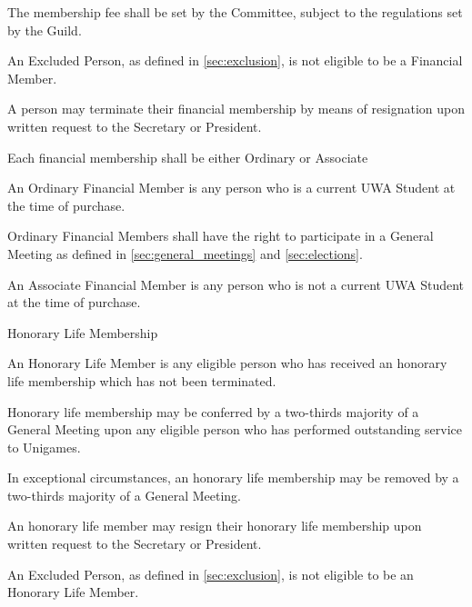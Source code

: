 \documentclass[a4paper]{article}
\begin{document}
\begin{myEnumerate}
\begin{myEnumerate}
\begin{myEnumerate}
                    \item The membership fee shall be set by the Committee, subject to the regulations set by the Guild.
                    \item An Excluded Person, as defined in \cref{sec:exclusion}, is not eligible to be a Financial Member.
                    \item A person may terminate their financial membership by means of resignation upon written request to the Secretary or President.
                    \item Each financial membership shall be either Ordinary or Associate
                    \begin{myEnumerate}
                      \item An Ordinary Financial Member is any person who is a current UWA Student at the time of purchase.
                      \begin{myEnumerate}
                          \item Ordinary Financial Members shall have the right to participate in a General Meeting as defined in \cref{sec:general_meetings} and \cref{sec:elections}.
                      \end{myEnumerate}
                      \item An Associate Financial Member is any person who is not a current UWA Student at the time of purchase.
                  \end{myEnumerate}
                \end{myEnumerate}
        \end{myEnumerate}
    \item Honorary Life Membership
          \begin{myEnumerate}
              \item An Honorary Life Member is any eligible person who has received an honorary life membership which has not been terminated.
                \begin{myEnumerate}
                    \item Honorary life membership may be conferred by a two-thirds majority of a General Meeting upon any eligible person who has performed outstanding service to Unigames.
                    \item In exceptional circumstances, an honorary life membership may be removed by a two-thirds majority of a General Meeting.
                    \item An honorary life member may resign their honorary life membership upon written request to the Secretary or President.
                    \item An Excluded Person, as defined in \cref{sec:exclusion}, is not eligible to be an Honorary Life Member.
                \end{myEnumerate}
          \end{myEnumerate}
\end{myEnumerate}
\end{document}
